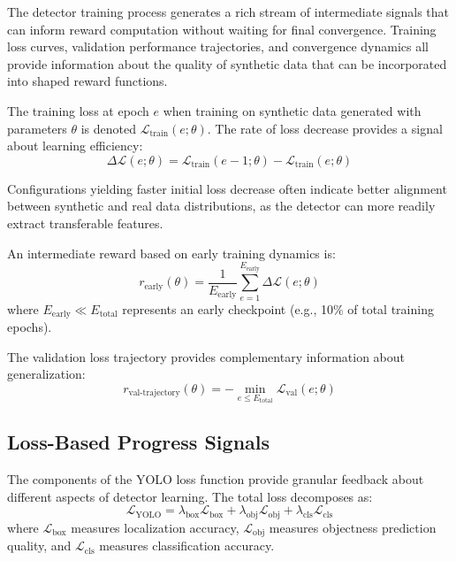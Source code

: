 The detector training process generates a rich stream of intermediate signals that can inform reward computation without waiting for final convergence. Training loss curves, validation performance trajectories, and convergence dynamics all provide information about the quality of synthetic data that can be incorporated into shaped reward functions.

The training loss at epoch $e$ when training on synthetic data generated with parameters $\theta$ is denoted $\mathcal{L}_{\text{train}}(e; \theta)$. The rate of loss decrease provides a signal about learning efficiency:
\begin{equation}
\Delta \mathcal{L}(e; \theta) = \mathcal{L}_{\text{train}}(e-1; \theta) - \mathcal{L}_{\text{train}}(e; \theta)
\label{eq:loss_decrease}
\end{equation}

Configurations yielding faster initial loss decrease often indicate better alignment between synthetic and real data distributions, as the detector can more readily extract transferable features.

An intermediate reward based on early training dynamics is:
\begin{equation}
r_{\text{early}}(\theta) = \frac{1}{E_{\text{early}}} \sum_{e=1}^{E_{\text{early}}} \Delta \mathcal{L}(e; \theta)
\label{eq:early_training_reward}
\end{equation}
where $E_{\text{early}} \ll E_{\text{total}}$ represents an early checkpoint (e.g., 10\% of total training epochs).

The validation loss trajectory provides complementary information about generalization:
\begin{equation}
r_{\text{val-trajectory}}(\theta) = -\min_{e \leq E_{\text{total}}} \mathcal{L}_{\text{val}}(e; \theta)
\label{eq:val_trajectory_reward}
\end{equation}

\subsection{Loss-Based Progress Signals}

The components of the YOLO loss function provide granular feedback about different aspects of detector learning. The total loss decomposes as:
\begin{equation}
\mathcal{L}_{\text{YOLO}} = \lambda_{\text{box}} \mathcal{L}_{\text{box}} + \lambda_{\text{obj}} \mathcal{L}_{\text{obj}} + \lambda_{\text{cls}} \mathcal{L}_{\text{cls}}
\label{eq:yolo_loss_decomposition}
\end{equation}
where $\mathcal{L}_{\text{box}}$ measures localization accuracy, $\mathcal{L}_{\text{obj}}$ measures objectness prediction quality, and $\mathcal{L}_{\text{cls}}$ measures classification accuracy.

